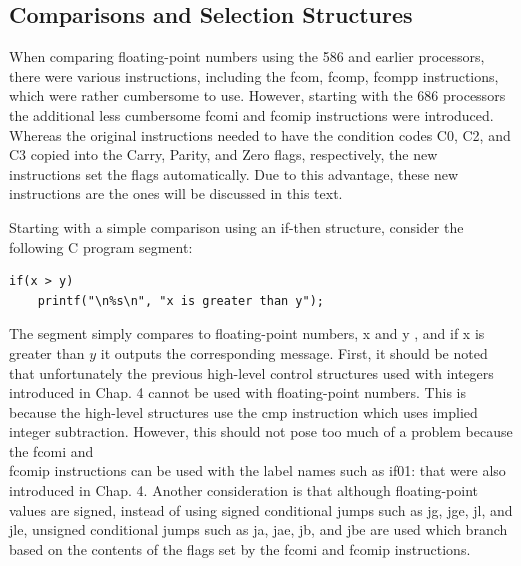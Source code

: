 \documentclass[10pt]{article}
\begin{document}
\subsection*{Comparisons and Selection Structures}
When comparing floating-point numbers using the 586 and earlier processors, there were various instructions, including the fcom, fcomp, fcompp instructions, which were rather cumbersome to use. However, starting with the 686 processors the additional less cumbersome fcomi and fcomip instructions were introduced. Whereas the original instructions needed to have the condition codes C0, C2, and C3 copied into the Carry, Parity, and Zero flags, respectively, the new instructions set the flags automatically. Due to this advantage, these new instructions are the ones will be discussed in this text.

Starting with a simple comparison using an if-then structure, consider the following C program segment:

\begin{verbatim}
if(x > y)
    printf("\n%s\n", "x is greater than y");
\end{verbatim}

The segment simply compares to floating-point numbers, x and y , and if x is greater than $y$ it outputs the corresponding message. First, it should be noted that unfortunately the previous high-level control structures used with integers introduced in Chap. 4 cannot be used with floating-point numbers. This is because the high-level structures use the cmp instruction which uses implied integer subtraction. However, this should not pose too much of a problem because the fcomi and\\
fcomip instructions can be used with the label names such as if01: that were also introduced in Chap. 4. Another consideration is that although floating-point values are signed, instead of using signed conditional jumps such as jg, jge, jl, and jle, unsigned conditional jumps such as ja, jae, jb, and jbe are used which branch based on the contents of the flags set by the fcomi and fcomip instructions.
\end{document}
